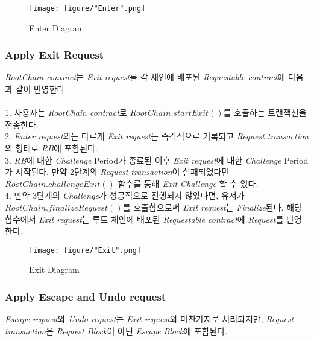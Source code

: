 \documentclass[letterpaper, 11pt]{article}
\begin{document}
\begin{CJK}{UTF8}{mj}
\begin{CJK}{UTF8}{mj}
\begin{figure}[H]
\centering
\texttt{[image: figure/"Enter".png]}
\caption{Enter Diagram}
\label{fig:enter-diagram}
\end{figure}

\end{CJK}

\subsubsection{Apply Exit Request}
\begin{CJK}{UTF8}{mj}
\emph{RootChain contract}는 \emph{Exit request}를 각 체인에 배포된 \emph{Requestable contract}에 다음과 같이 반영한다. \\
\\
1. 사용자는 \emph{RootChain contract}로 $RootChain.startExit()$를 호출하는 트랜잭션을 전송한다.\\
2. \emph{Enter request}와는 다르게 \emph{Exit request}는 즉각적으로 기록되고 \emph{Request transaction}의 형태로 \emph{RB}에 포함된다. \\
3. \emph{RB}에 대한 \emph{Challenge} Period가 종료된 이후 \emph{Exit request}에 대한 \emph{Challenge} Period가 시작된다. 만약 2단계의 \emph{Request transaction}이 실패되었다면 $RootChain.challengeExit()$ 함수를 통해 \emph{Exit Challenge} 할 수 있다. \\
4. 만약 3단계의 \emph{Challenge}가 성공적으로 진행되지 않았다면, 유저가 $RootChain.finalizeRequest()$를 호출함으로써 \emph{Exit request}는 \emph{Finalize}된다. 해당 함수에서 \emph{Exit request}는 루트 체인에 배포된 \emph{Requestable contract}에 \emph{Request}를 반영한다.

\begin{figure}[H]
\centering
\texttt{[image: figure/"Exit".png]}
\caption{Exit Diagram}
\label{fig:exit-diagram}
\end{figure}

\end{CJK}

\subsubsection{Apply Escape and Undo request}
\begin{CJK}{UTF8}{mj}
\emph{Escape request}와 \emph{Undo request}는 \emph{Exit request}와 마찬가지로 처리되지만, \emph{Request transaction}은 \emph{Request Block}이 아닌 \emph{Escape Block}에 포함된다.
\end{CJK}

\end{CJK}
\end{document}
